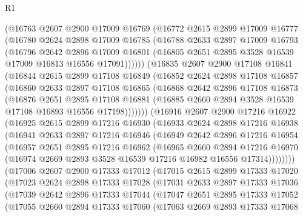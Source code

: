 \begin{lexlean}{R1}
\begin{coremodule}
    (@16763
      @2607
      @2900
      @17009
      @16769
      (@16772
        @2615
        @2899
        @17009
        @16777
        (@16780
          @2624
          @2898
          @17009
          @16785
          (@16788
            @2633
            @2897
            @17009
            @16793
            (@16796
              @2642
              @2896
              @17009
              @16801
              (@16805 @2651 @2895 @3528 @16539 @17009 @16813 @16556 @17091))))))
    (@16835
      @2607
      @2900
      @17108
      @16841
      (@16844
        @2615
        @2899
        @17108
        @16849
        (@16852
          @2624
          @2898
          @17108
          @16857
          (@16860
            @2633
            @2897
            @17108
            @16865
            (@16868
              @2642
              @2896
              @17108
              @16873
              (@16876
                @2651
                @2895
                @17108
                @16881
                (@16885 @2660 @2894 @3528 @16539 @17108 @16893 @16556 @17198)))))))
    (@16916
      @2607
      @2900
      @17216
      @16922
      (@16925
        @2615
        @2899
        @17216
        @16930
        (@16933
          @2624
          @2898
          @17216
          @16938
          (@16941
            @2633
            @2897
            @17216
            @16946
            (@16949
              @2642
              @2896
              @17216
              @16954
              (@16957
                @2651
                @2895
                @17216
                @16962
                (@16965
                  @2660
                  @2894
                  @17216
                  @16970
                  (@16974 @2669 @2893 @3528 @16539 @17216 @16982 @16556 @17314))))))))
    (@17006
      @2607
      @2900
      @17333
      @17012
      (@17015
        @2615
        @2899
        @17333
        @17020
        (@17023
          @2624
          @2898
          @17333
          @17028
          (@17031
            @2633
            @2897
            @17333
            @17036
            (@17039
              @2642
              @2896
              @17333
              @17044
              (@17047
                @2651
                @2895
                @17333
                @17052
                (@17055
                  @2660
                  @2894
                  @17333
                  @17060
                  (@17063
                    @2669
                    @2893
                    @17333
                    @17068

\end{coremodule}
\end{lexlean}
